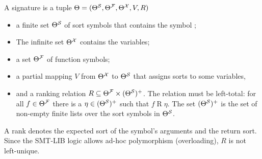 \begin{definition}[Signature]\label{def:smt-signature}
A signature is a tuple $\Theta = (\Theta^\cal{S}, \Theta^\cal{F}, \Theta^\cal{X}, V, R)$
\begin{itemize}
    \item  a finite set $\Theta^\cal{S}$  of sort symbols that contains the symbol ;
    \item The infinite set $\Theta^\cal{X}$ contains the variables;
    \item a set $\Theta^\cal{F}$ of function symbols;
    \item a partial mapping $V$ from $\Theta^\cal{X}$ to $\Theta^\cal{S}$ that assigns sorts to some variables,
    \item and a ranking relation $R \subseteq \Theta^\cal{F} \times (\Theta^\cal{S})^+$. The relation must be left-total: for
    all $f \in \Theta^\cal{F}$ there is a $\eta \in (\Theta^\cal{S})^+$ such that $f \mathrel{R} \eta$. The set $(\Theta^\cal{S})^+$ 
    is the set of non-empty finite lists over the sort symbols in $\Theta^\cal{S}$.
\end{itemize}
\end{definition}

A rank denotes the expected sort of the symbol's arguments and the return sort.
Since the SMT-LIB logic allows ad-hoc polymorphism (overloading), $R$ is not left-unique.

